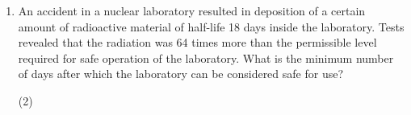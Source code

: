 
\begin{enumerate}
    \item An accident in a nuclear laboratory resulted in deposition of a certain amount of radioactive material of half-life 18 days inside the laboratory. Tests revealed that the radiation was 64 times more than the permissible level required for safe operation of the laboratory. What is the minimum number of days after which the laboratory can be considered safe for use?
        \begin{tasks}(2)
        \end{tasks}
\end{enumerate}
